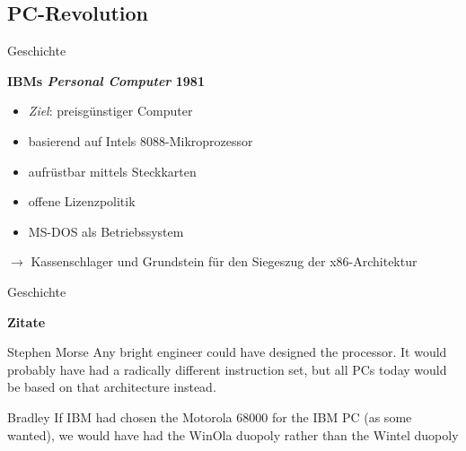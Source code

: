 \subsection{PC-Revolution}
\begin{frame}{Geschichte}
	\begin{center}
		\textbf{IBMs \textit{Personal Computer}	1981}
	\end{center}

	\begin{itemize}
		\item \emph{Ziel}: preisgünstiger Computer
		\item basierend auf Intels 8088-Mikroprozessor
		\item aufrüstbar mittels Steckkarten
		\item offene Lizenzpolitik
		\item MS-DOS als Betriebssystem
	\end{itemize}

	$\rightarrow$ Kassenschlager und Grundstein für den Siegeszug der x86-Architektur 
\end{frame}

\begin{frame}{Geschichte}
	\begin{center}
		\textbf{Zitate}
	\end{center}

	\begin{block}{Stephen Morse}
		Any bright engineer could have designed the processor. It would probably have had a radically different instruction set, but all PCs today would be based on that architecture instead.
	\end{block}

	\pause

	\begin{block}{Bradley}
		If IBM had chosen the Motorola 68000 for the IBM PC (as some wanted), we would have had the WinOla duopoly rather than the Wintel duopoly
	\end{block}
\end{frame}
